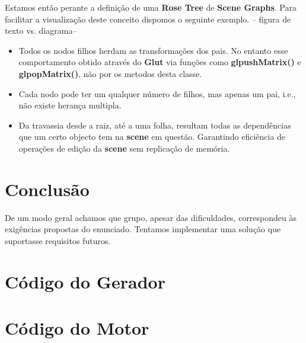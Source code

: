 \documentclass{article}
\begin{document}
Estamos então perante a definição de uma \textbf{Rose Tree} de \textbf{Scene Graphs}. Para facilitar a visualização deste conceito dispomos o seguinte exemplo. 
-- figura de texto vs. diagrama--
\begin{info}
	\begin{itemize}
		\item Todos os nodos filhos herdam as transformações dos pais. No entanto esse comportamento obtido através do \textbf{Glut} via funções como \textbf{glpushMatrix()} e \textbf{glpopMatrix()}, não por os metodos desta classe.   
		\item Cada nodo pode ter um qualquer número de filhos, mas apenas um pai, i.e., não existe herança multipla.
		\item Da travassia desde a raiz, até a uma folha, resultam todas as dependências que um certo objecto tem na \textbf{scene} em questão. Garantindo eficiência de operações de edição da \textbf{scene} sem replicação de memória. 
	\end{itemize}
\end{info}
\newpage

\section{Conclusão}
De um modo geral achamos que grupo, apesar das dificuldades,  correspondeu às exigências propostas do enunciado. Tentamos implementar uma solução que suportasse requisitos futuros.  

\newpage
\appendix

\section{Código do Gerador}

\newpage

\section{Código do Motor}
\end{document}
